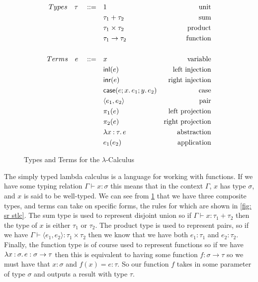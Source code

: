 \begin{figure}[h]
    \begin{align*}
        Types \quad \tau \quad ::= \quad & 1 &\text{unit} \\
        & \tau_1 + \tau_2 &\text{sum} \\
        & \tau_1 \times \tau_2 &\text{product} \\
        & \tau_1 \rightarrow \tau_2 &\text{function} \\
        \\
        Terms \quad e \quad ::= \quad & x &\text{variable} \\
        & \LamInl{e} &\text{left injection} \\
        & \LamInr{e} &\text{right injection} \\
        & \LamCase{e}{x}{e_1}{y}{e_2} &\text{case} \\
        & \Tuple{e_1}{e_2} &\text{pair} \\
        & \Proj{e} &\text{left projection} \\
        & \Proj[2]{e} &\text{right projection} \\
        & \Lam{x}[\tau]{e} &\text{abstraction} \\
        & e_1 (e_2) &\text{application}
    \end{align*}
    \caption{Types and Terms for the $\lambda$-Calculus}
    \label{fig: tt stlc}
\end{figure}

\noindent
The simply typed lambda calculus is a language for working with functions. If we have some typing
relation $\Gamma \vdash x: \sigma$ this means that in the context $\Gamma$, $x$ has type $\sigma$,
and $x$ is said to be well-typed. We can see from \ref{fig: tt stlc} that we have three composite
types, and terms can take on specific forms, the rules for which are shown in \ref{fig: sr stlc}. The
sum type is used to represent disjoint union so if $\Gamma \vdash x: \tau_1 + \tau_2$ then the type 
of $x$ is either $\tau_1$ or $\tau_2$. The product type is used to represent pairs, so if we have
$\Gamma \vdash \langle e_1, e_2 \rangle : \tau_1 \times \tau_2$ then we know that we have both 
$e_1: \tau_1$ and $e_2: \tau_2$. Finally, the function type is of course used to represent functions
so if we have $\Lam{x}[\sigma]{e}: \sigma \rightarrow \tau$ then this is equivalent to having some 
function $f : \sigma \rightarrow \tau$ so we must have that $x: \sigma$ and $f(x) = e: \tau$. 
So our function $f$ takes in some parameter of type $\sigma$ and outputs a result with type $\tau$.\\

